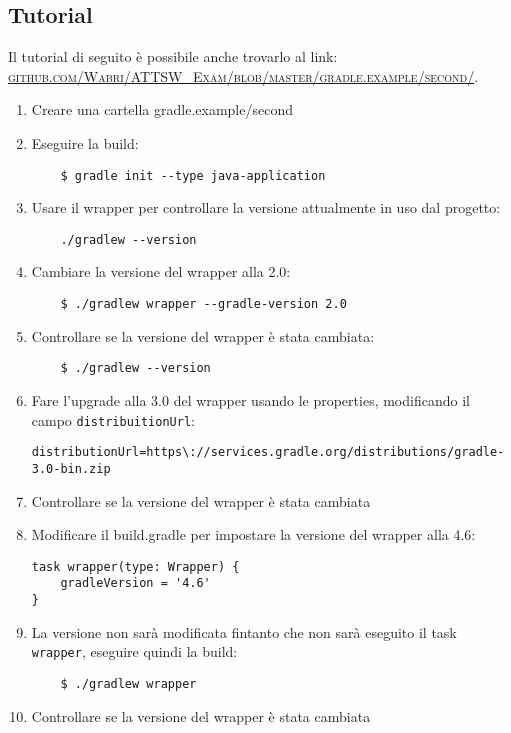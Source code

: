 \subsection{Tutorial}
Il tutorial di seguito è possibile anche trovarlo al link: \href{https://github.com/Wabri/ATTSW_Exam/blob/master/gradle.example/second/}{\textsc{github.com/Wabri/ATTSW\_Exam/blob/master/gradle.example/second/}}.
\begin{enumerate}
    \item Creare una cartella gradle.example/second
    \item Eseguire la build:
\begin{verbatim}
    $ gradle init --type java-application
\end{verbatim}
    \item Usare il wrapper per controllare la versione attualmente in uso dal progetto:
\begin{verbatim}
    ./gradlew --version\end{verbatim}
    \item Cambiare la versione del wrapper alla 2.0:
\begin{verbatim}
    $ ./gradlew wrapper --gradle-version 2.0\end{verbatim}
    \item Controllare se la versione del wrapper è stata cambiata:
\begin{verbatim}
    $ ./gradlew --version\end{verbatim}
    \item Fare l'upgrade alla 3.0 del wrapper usando le properties, modificando il campo \texttt{distribuitionUrl}:
\begin{verbatim}
distributionUrl=https\://services.gradle.org/distributions/gradle-3.0-bin.zip \end{verbatim}
    \item Controllare se la versione del wrapper è stata cambiata
    \item Modificare il build.gradle per impostare la versione del wrapper alla 4.6:
\begin{lstlisting}[frame=single]
task wrapper(type: Wrapper) {
    gradleVersion = '4.6'
}
\end{lstlisting}
    \item La versione non sarà modificata fintanto che non sarà eseguito il task \texttt{wrapper}, eseguire quindi la build:
\begin{verbatim}
    $ ./gradlew wrapper\end{verbatim}
    \item Controllare se la versione del wrapper è stata cambiata

\end{enumerate}
